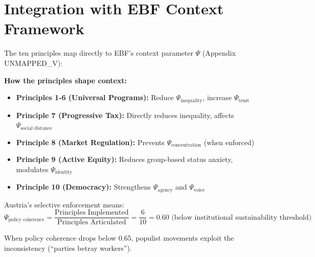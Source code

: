 
\section{Integration with EBF Context Framework}
\label{sec:bf-integration}

The ten principles map directly to EBF's context parameter $\Psi$ (Appendix UNMAPPED_V):

\begin{tcolorbox}[colback=yellow!5!white, colframe=yellow!75!black,
    title=Integration: Principles $\leftrightarrow$ Context Dimensions]

\textbf{How the principles shape context:}

\begin{itemize}[nosep]
\item \textbf{Principles 1-6 (Universal Programs):} Reduce $\Psi_{\text{inequality}}$, increase $\Psi_{\text{trust}}$
\item \textbf{Principle 7 (Progressive Tax):} Directly reduces inequality, affects $\Psi_{\text{social distance}}$
\item \textbf{Principle 8 (Market Regulation):} Prevents $\Psi_{\text{concentration}}$ (when enforced)
\item \textbf{Principle 9 (Active Equity):} Reduces group-based status anxiety, modulates $\Psi_{\text{identity}}$
\item \textbf{Principle 10 (Democracy):} Strengthens $\Psi_{\text{agency}}$ and $\Psi_{\text{voice}}$
\end{itemize}

Austria's selective enforcement means:
\begin{equation}
\Psi_{\text{policy coherence}} = \frac{\text{Principles Implemented}}{\text{Principles Articulated}} = \frac{6}{10} = 0.60 \text{ (below institutional sustainability threshold)}
\end{equation}

When policy coherence drops below 0.65, populist movements exploit the inconsistency (``parties betray workers'').

\end{tcolorbox}


